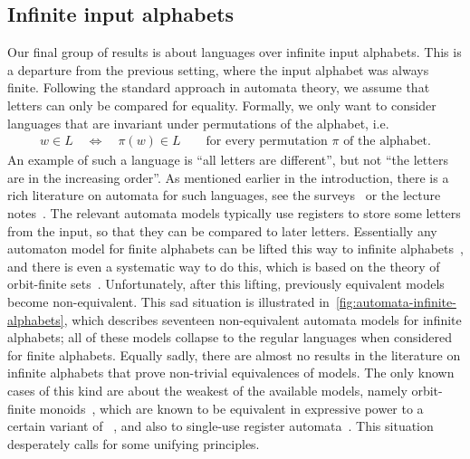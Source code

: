 \subsection{Infinite input alphabets}
\label{sec:intro-infinite}
Our final group of results is about languages over infinite input alphabets. This is a departure from the previous setting, where  the input alphabet was always finite. Following the standard approach in automata theory, we assume that letters can only be compared for equality. Formally, we only want to consider languages that are invariant under permutations of the
alphabet, i.e.
\begin{align*}
w \in L 
\quad \iff \quad
\pi(w) \in L \qquad \text{for every permutation $\pi$ of the alphabet}.
\end{align*}
An example of such a language is ``all letters are different'', but not ``the letters are in the increasing order''.
 As mentioned earlier in the introduction, there is a rich literature on automata for such languages, see the surveys~\cite{neven2003power,segoufin2006automata,bojanczykOrbitFiniteSetsTheir2017} or the lecture notes~\cite{bojanczyk_slightly}.  The  relevant automata models typically use registers to store some letters from the input, so that they can be compared to later letters. Essentially any automaton model for finite alphabets can be lifted this way to infinite alphabets~\cite[Figure 1]{neven2003power}, and there is even a systematic way to do this, which is based on the theory of orbit-finite sets~\cite[Chapter 2]{bojanczyk_slightly}. Unfortunately, after this lifting, previously equivalent models become non-equivalent.  This sad situation is illustrated in~\cref{fig:automata-infinite-alphabets}, which describes seventeen non-equivalent automata models for infinite alphabets; all of these models collapse to the regular languages when considered for finite alphabets. Equally sadly, there are almost no results in the literature on infinite alphabets that prove non-trivial equivalences of models. The only known cases of this kind are about the  weakest of the available models, namely orbit-finite monoids~\cite{bojanczykNominalMonoids2013}, which are known to be equivalent in expressive power to a certain variant of \mso~\cite[Theorems 4.2 and 5.1]{DBLP:journals/corr/ColcombetLP14}, and also to single-use register automata~\cite[Theorem 6]{bojanczykstefanski2020}.
This situation desperately calls for some unifying principles. 

